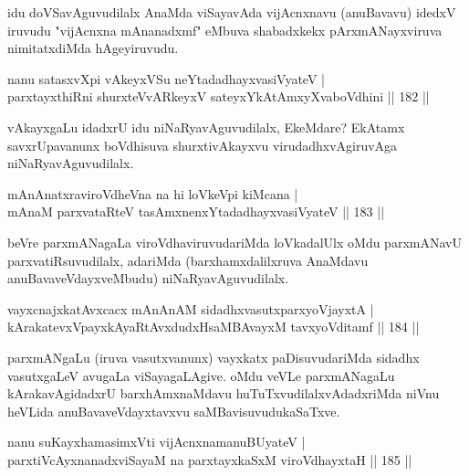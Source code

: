 \begin{artha}
idu doVSavAguvudilalx AnaMda viSayavAda vijAcnxnavu (anuBavavu) idedxV iruvudu "vijAcnxna mAnanadxmf" eMbuva shabadxkekx pArxmANayxviruva nimitatxdiMda hAgeyiruvudu.
\end{artha}


\begin{shl}
nanu satasxvXpi vAkeyxVSu neYtadadhayxvasiVyateV |\\
parxtayxthiRni shurxteVvARkeyxV sateyxYkAtAmxyXvaboVdhini \hfill || 182 ||
\end{shl}

\begin{artha}
vAkayxgaLu idadxrU idu niNaRyavAguvudilalx, EkeMdare? EkAtamx savxrUpavanunx boVdhisuva shurxtivAkayxvu virudadhxvAgiruvAga niNaRyavAguvudilalx.
\end{artha}

\begin{shl}
mAnAnatxraviroVdheVna na hi loVkeV\s pi kiMcana |\\
mAnaM parxvataRteV tasAmxnenxYtadadhayxvasiVyateV \hfill || 183 ||
\end{shl}

\begin{artha}
beVre parxmANagaLa viroVdhaviruvudariMda loVkadalUlx oMdu parxmANavU parxvatiRsuvudilalx, adariMda (barxhamxdalilxruva AnaMdavu anuBavaveVdayxveMbudu) niNaRyavAguvudilalx. 
\end{artha}

\begin{shl}
vayxcnajxkatAvxcacx mAnAnAM sidadhxvasutxparxyoVjayxtA |\\
kArakatevxV\s payxkAyaRtAvxdudxHsaMBAvayxM tavxyoVditamf \hfill || 184 ||
\end{shl}

\begin{artha}%
parxmANgaLu (iruva vasutxvanunx) vayxkatx paDisuvudariMda sidadhx vasutxgaLeV avugaLa viSayagaLAgive. oMdu veVLe parxmANagaLu kArakavAgidadxrU barxhAmxnaMdavu huTuTxvudilalxvAdadxriMda niVnu heVLida anuBavaveVdayxtavxvu saMBavisuvudukaSaTxve.
\end{artha}


\begin{shl}
nanu suKayxhamasimxVti vijAcnxnamanuBUyateV |\\
parxtiVcAyxnanadxviSayaM na parxtayxkaSxM viroVdhayxtaH \hfill || 185 ||
\end{shl}


